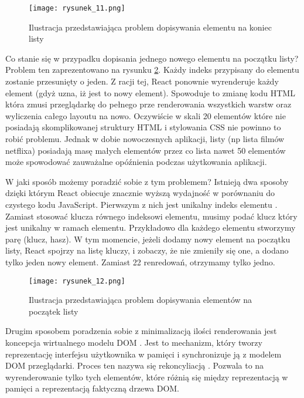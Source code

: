 \begin{figure}[!ht]
    \centering
    \texttt{[image: rysunek\_11.png]}
    \caption{Ilustracja przedstawiająca problem dopisywania elementu na koniec listy}
    \label{fig:rysunek_11}
\end{figure}

Co stanie się w przypadku dopisania jednego nowego elementu na początku listy? Problem ten zaprezentowano na rysunku \ref{fig:rysunek_12}. Każdy indeks przypisany do elementu zostanie przesunięty o jeden.
Z racji tej, React ponownie wyrenderuje każdy element (gdyż uzna, iż jest to nowy element). Spowoduje to zmianę kodu HTML która zmusi przeglądarkę do pełnego prze renderowania wszystkich warstw oraz wyliczenia całego layoutu na nowo.
Oczywiście w skali 20 elementów które nie posiadają skomplikowanej struktury HTML i stylowania CSS nie powinno to robić problemu.
Jednak w dobie nowoczesnych aplikacji, listy (np lista filmów netflixa) posiadają masę małych elementów przez co lista nawet 50 elementów może spowodować zauważalne opóźnienia podczas użytkowania aplikacji.

W jaki sposób możemy poradzić sobie z tym problemem? Istnieją dwa sposoby dzięki którym React obiecuje znacznie wyższą wydajność w porównaniu do czystego kodu JavaScript.
Pierwszym z nich jest unikalny indeks elementu \cite{react-lists}. Zamiast stosować klucza równego indeksowi elementu, musimy podać klucz który jest unikalny w ramach elementu.
Przykładowo dla każdego elementu stworzymy parę (klucz, hasz). W tym momencie, jeżeli dodamy nowy element na początku listy, React spojrzy na listę kluczy, i zobaczy, że nie zmieniły się one, a dodano tylko jeden nowy element.
Zamiast 22 renredowań, otrzymamy tylko jedno.

\begin{figure}[!ht]
    \centering
    \texttt{[image: rysunek\_12.png]}
    \caption{Ilustracja przedstawiająca problem dopisywania elementów na początek listy}
    \label{fig:rysunek_12}
\end{figure}

Drugim sposobem poradzenia sobie z minimalizacją ilości renderowania jest koncepcja wirtualnego modelu DOM \cite{virtualdom}.
Jest to mechanizm, który tworzy reprezentację interfejsu użytkownika w pamięci i synchronizuje ją z modelem DOM przeglądarki. Proces ten nazywa się rekoncyliacją \cite{reconcilation}.
Pozwala to na wyrenderowanie tylko tych elementów, które różnią się między reprezentacją w pamięci a reprezentacją faktyczną drzewa DOM.

